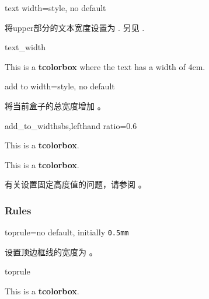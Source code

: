 \begin{docTcbKey}[][doc new=2014-10-31]{text width}{=}{style, no default}

将upper部分的文本宽度设置为 .
另见 .
\begin{exdispExample}{text_width}

\begin{tcolorbox}[text width=4cm]
This is a \textbf{tcolorbox} where the text has a width of 4cm.
\end{tcolorbox}
\end{exdispExample}
\end{docTcbKey}

\begin{docTcbKey}[][doc new=2014-11-07]{add to width}{=}{style, no default}

将当前盒子的总宽度增加  。    
\begin{exdispExample*}{add_to_width}{sbs,lefthand ratio=0.6}

\begin{tcolorbox}
This is a \textbf{tcolorbox}.
\end{tcolorbox}

\begin{tcolorbox}[add to width=1cm]
This is a \textbf{tcolorbox}.
\end{tcolorbox}
\end{exdispExample*}
\end{docTcbKey}


有关设置固定高度值的问题，请参阅 。



\subsubsection{Rules}
\begin{docTcbKey}{toprule}{=}{no default, initially \texttt{0.5mm}}

设置顶边框线的宽度为 。
\begin{exdispExample}{toprule}

\begin{tcolorbox}[toprule=3mm]
This is a \textbf{tcolorbox}.
\end{tcolorbox}
\end{exdispExample}
\end{docTcbKey}


